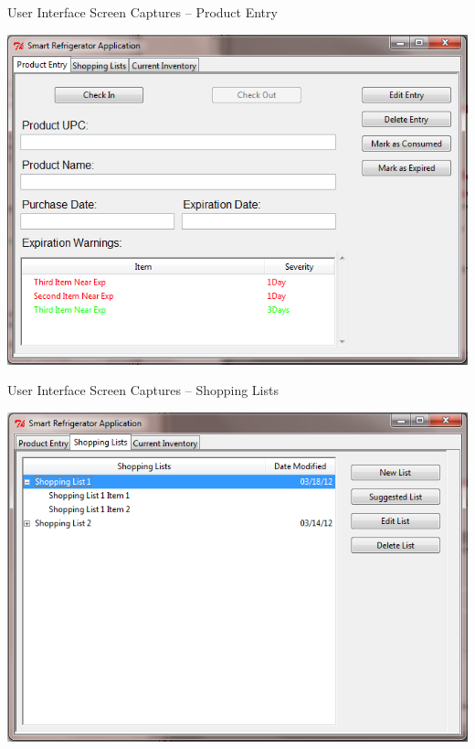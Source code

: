 \documentclass[t]{beamer}
\begin{document}
\begin{frame}{User Interface Screen Captures -- Product Entry}
\begin{center}
\includegraphics[scale=0.40]{../Graphics/Screenshot1}
\end{center}
\end{frame}

\begin{frame}{User Interface Screen Captures -- Shopping Lists}
\begin{center}
\includegraphics[scale=0.40]{../Graphics/Screenshot2}
\end{center}
\end{frame}
\end{document}
